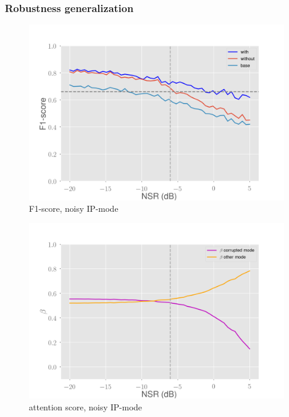 \documentclass[10pt]{beamer}
\begin{document}
\begin{frame}
\frametitle{Robustness generalization}
\begin{multicols}{2}
\begin{figure}
\centering
\begin{overprint}
    \includegraphics[scale=0.2]{figs/noise-generalisation-ip-noisy}
\end{overprint}
\caption{F1-score, noisy IP-mode}
\end{figure}
\columnbreak
\begin{figure}
\centering
\begin{overprint}
    \includegraphics[scale=0.2]{figs/normal-ip-noisy-beta}
\end{overprint}
\caption{attention score, noisy IP-mode}
\end{figure}
\end{multicols}
\end{frame}
\end{document}
